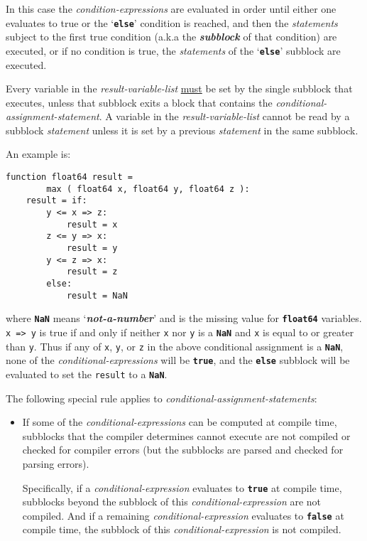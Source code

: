 \documentclass[12pt]{article}
\newcommand{\TT}[1]{{\tt \bfseries #1}}
\newcommand{\key}[1]{{\bf \em #1}\index{#1}}
\newenvironment{indpar}[1][0.3in]%
	{\begin{list}{}%
		     {\setlength{\itemsep}{0in}%
		      \setlength{\topsep}{0in}%
		      \setlength{\parsep}{1ex}%
		      \setlength{\labelwidth}{#1}%
		      \setlength{\leftmargin}{#1}%
		      \addtolength{\leftmargin}{\labelsep}}%
	 \item}%
	{\end{list}}
\begin{document}
In this case the {\em condition-expressions} are evaluated in order
until either one evaluates to true or the `\TT{else}' condition is
reached, and then the {\em statements} subject to the
first true condition (a.k.a the \key{subblock} of that condition)
are executed, or if no condition is true, the {\em statements}
of the `\TT{else}' subblock are executed.

Every variable in the {\em result-variable-list} \underline{must} be set by the
single subblock that executes, unless that subblock exits a block
that contains the {\em conditional-assignment-statement}.  A variable in the
{\em result-variable-list} cannot be read by a subblock {\em statement}
unless it is set by a previous {\em statement} in the
same subblock.

An example is:
\begin{indpar}\begin{verbatim}
function float64 result =
        max ( float64 x, float64 y, float64 z ):
    result = if:
        y <= x => z:
            result = x
        z <= y => x:
            result = y
        y <= z => x:
            result = z
        else:
            result = NaN
\end{verbatim}\end{indpar}

where \TT{NaN} means `\key{not-a-number}' and is the missing
value for \TT{float64} variables.  {\tt x~=>~y} is true if
and only if neither {\tt x} nor {\tt y} is a \TT{NaN} and
{\tt x} is equal to or greater than {\tt y}.  Thus if any of
{\tt x}, {\tt y}, or {\tt z} in the above conditional assignment
is a \TT{NaN}, none of the {\em conditional-expressions}
will be \TT{true}, and the \TT{else} subblock will be evaluated to set
the {\tt result} to a \TT{NaN}.

The following special rule applies to
{\em conditional-assignment-statements}:\label{CONDITIONAL-SPECIAL-RULE}

\begin{itemize}
\item
If some of the {\em conditional-expressions} can be computed at compile
time, subblocks that the compiler determines cannot execute are not
compiled or checked for compiler errors (but the subblocks are parsed
and checked for parsing errors).

Specifically, if a {\em conditional-expression} evaluates to \TT{true}
at compile time, subblocks beyond the subblock
of this {\em conditional-expression}
are not compiled.  And if a remaining {\em conditional-expression}
evaluates to \TT{false} at compile time, the subblock of this
{\em conditional-expression} is not compiled.
\end{itemize}
\end{document}
